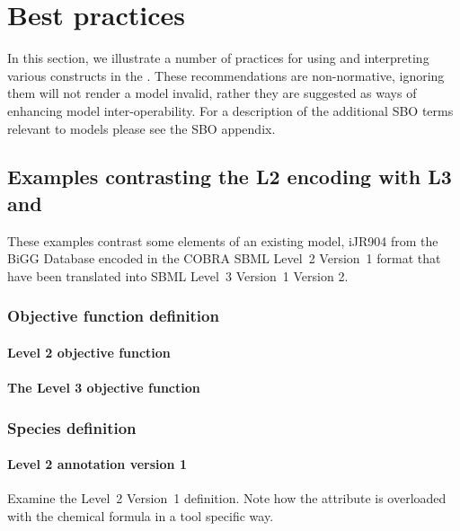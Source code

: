 
\section{Best practices}
\label{best-practices}

In this section, we illustrate a number of practices for using and
interpreting various constructs in the \FBCPackage.
These recommendations are non-normative, ignoring them will not render a model invalid, rather they are suggested as ways of enhancing model inter-operability. For a description of the additional SBO terms relevant to \FBC models please see the SBO appendix.

\subsection{Examples contrasting the \SBML L2 encoding with L3 and \FBC}
\label{best-practices-cobraV2}
These examples contrast some elements of an existing model, iJR904 from the \textsf{BiGG} Database encoded in the \textsf{COBRA} SBML Level~2 Version~1 format \citep{ijr904, bigg, cobra} that have been translated into SBML Level~3 Version~1 \FBC Version 2.

\subsubsection*{Objective function definition}
\paragraph{\SBML Level 2 objective function}

\paragraph{The \SBML Level 3 objective function}
\protect{}

\subsubsection*{Species definition}
\paragraph{\SBML Level 2 \Species annotation version 1}
Examine the \SBML Level~2 Version~1 \Species definition. Note how the  attribute is overloaded with the chemical formula in a tool specific way.
%


